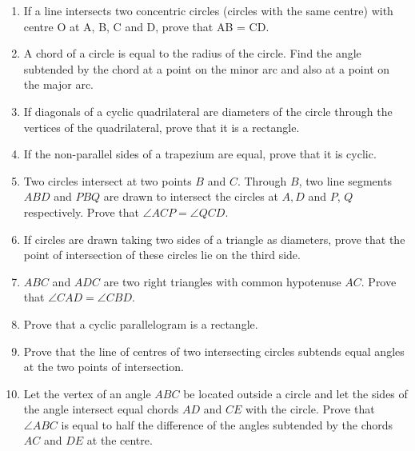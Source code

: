 \begin{enumerate}[label=\arabic*.,ref=\thesubsection.\theenumi]
\item If a line intersects two concentric circles (circles with the same centre) with centre O at A, B, C and D, prove that AB = CD.
\begin{enumerate}


\end{enumerate}
\item A chord of a circle is equal to the radius of the
circle. Find the angle subtended by the chord at
a point on the minor arc and also at a point on the
major arc.
\item If diagonals of a cyclic quadrilateral are diameters of the circle through the vertices of
the quadrilateral, prove that it is a rectangle.
\item If the non-parallel sides of a trapezium are equal, prove that it is cyclic.
\item Two circles intersect at two points $B$ and $C$.
Through $B$, two line segments $ABD$ and $PBQ$
are drawn to intersect the circles at $A, D$ and $P$,
$Q$ respectively. Prove that
$\angle ACP = \angle QCD$.
\item If circles are drawn taking two sides of a triangle as diameters, prove that the point of
intersection of these circles lie on the third side.
\item $ABC$ and $ADC$ are two right triangles with common hypotenuse $AC$. Prove that
$\angle CAD = \angle CBD$.
\item Prove that a cyclic parallelogram is a rectangle.
\item Prove that the line of centres of two intersecting circles subtends equal angles at the
two points of intersection.
\item Let the vertex of an angle $ABC$ be located outside a circle and let the sides of the angle
intersect equal chords $AD$ and $CE$ with the circle. Prove that $\angle ABC$ is equal to half the
difference of the angles subtended by the chords $AC$ and $DE$ at the centre.
\begin{enumerate}


\end{enumerate}


\end{enumerate}
